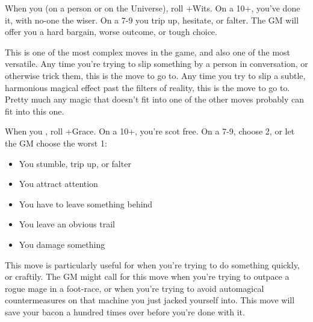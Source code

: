 \begin{multicols}{3}
  \columnbreak
    
  \begin{move}
    When you  (on a person or on the Universe),
    roll +Wits. On a 10+, you've done it, with no-one the wiser. On a
    7-9 you trip up, hesitate, or falter. The GM will offer you a hard
    bargain, worse outcome, or tough choice.
\begin{movedetail}
  This is one of the most complex moves in the game, and also one of
  the most versatile. Any time you're trying to slip something by a
  person in conversation, or otherwise trick them, this is the move to
  go to. Any time you try to slip a subtle, harmonious magical
  effect past the filters of reality, this is the move to go
  to. Pretty much any magic that doesn't fit into one of the other
  moves probably can fit into this one.
\end{movedetail}
  \end{move}

  \vspace{1em}
  
  \SEPARATOR

  \begin{move}
    When you , roll
    +Grace. On a 10+, you're scot free. On a 7-9, choose 2, or let
    the GM choose the worst 1:
    \begin{itemize}
      \setlength\itemsep{0em}
    \item You stumble, trip up, or falter
    \item You attract attention
    \item You have to leave something behind
    \item You leave an obvious trail
    \item You damage something
    \end{itemize}
\begin{movedetail}
  This move is particularly useful for when you're trying to do
  something quickly, or craftily. The GM might call for this move when
  you're trying to outpace a rogue mage in a foot-race, or when you're
  trying to avoid automagical countermeasures on that machine you just
  jacked yourself into. This move will save your bacon a hundred times
  over before you're done with it.
\end{movedetail}
  \end{move}

  \SEPARATOR


\end{multicols}
